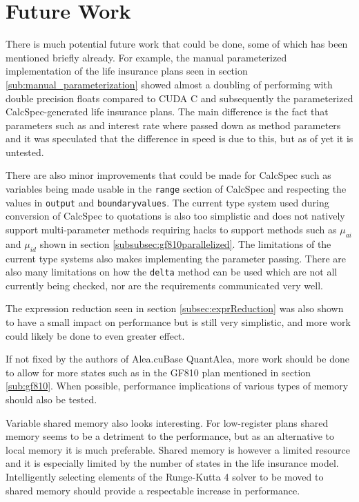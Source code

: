 \section{Future Work}
There is much potential future work that could be done, some of which has been mentioned briefly already.
For example, the manual parameterized implementation of the life insurance plans seen in section \ref{sub:manual_parameterization} showed almost a doubling of performing with double precision floats compared to CUDA C and subsequently the parameterized CalcSpec-generated life insurance plans.
The main difference is the fact that parameters such as and interest rate where passed down as method parameters and it was speculated that the difference in speed is due to this, but as of yet it is untested.

There are also minor improvements that could be made for CalcSpec such as variables being made usable in the \lstinline$range$ section of CalcSpec and respecting the values in \lstinline$output$ and \lstinline$boundaryvalues$.
The current type system used during conversion of CalcSpec to quotations is also too simplistic and does not natively support multi-parameter methods requiring hacks to support methods such as $\mu_{ai}$ and $\mu_{id}$ shown in section \ref{subsubsec:gf810parallelized}.
The limitations of the current type systems also makes implementing the parameter passing.
There are also many limitations on how the \lstinline$delta$ method can be used which are not all currently being checked, nor are the requirements communicated very well.

The expression reduction seen in section \ref{subsec:exprReduction} was also shown to have a small impact on performance but is still very simplistic, and more work could likely be done to even greater effect.

If not fixed by the authors of Alea.cuBase QuantAlea, more work should be done to allow for more states such as in the GF810 plan mentioned in section \ref{sub:gf810}.
When possible, performance implications of various types of memory should also be tested.

Variable shared memory also looks interesting. For low-register plans shared memory seems to be a detriment to the performance, but as an alternative to local memory it is much preferable.
Shared memory is however a limited resource and it is especially limited by the number of states in the life insurance model.
Intelligently selecting elements of the Runge-Kutta 4 solver to be moved to shared memory should provide a respectable increase in performance.

